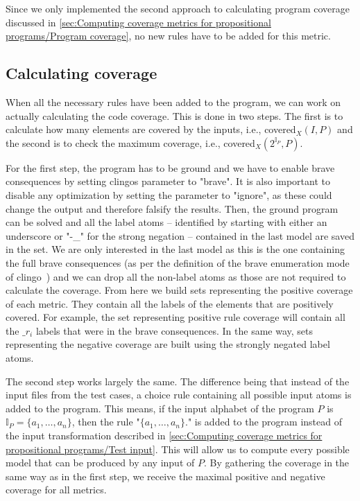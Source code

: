 Since we only implemented the second approach to calculating program coverage discussed in \cref{sec:Computing coverage metrics for propositional programs/Program coverage}, no new rules have to be added for this metric.

\subsection{Calculating coverage}
\label{subsec:Computing coverage metrics for propositional programs/Implementation details/Calculating coverage}
When all the necessary rules have been added to the program, we can work on actually calculating the code coverage. This is done in two steps. The first is to calculate how many elements are covered by the inputs, i.e., covered\(_X(I, P)\) and the second is to check the maximum coverage, i.e., covered\(_X(2^{\mathbb{I}_P}, P)\). 

For the first step, the program has to be ground and we have to enable brave consequences by setting clingos  parameter to "brave". It is also important to disable any optimization by setting the  parameter to "ignore", as these could change the output and therefore falsify the results. Then, the ground program can be solved and all the label atoms -- identified by starting with either an underscore or "-\_" for the strong negation -- contained in the last model are saved in the  set. We are only interested in the last model as this is the one containing the full brave consequences (as per the definition of the brave enumeration mode of clingo~\cite{GKS09}) and we can drop all the non-label atoms as those are not required to calculate the coverage. From here we build sets representing the positive coverage of each metric. They contain all the labels of the elements that are positively covered. For example, the set representing positive rule coverage will contain all the $\_r_i$ labels that were in the brave consequences. In the same way, sets representing the negative coverage are built using the strongly negated label atoms.

The second step works largely the same. The difference being that instead of the input files from the test cases, a choice rule containing all possible input atoms is added to the program. This means, if the input alphabet of the program $P$ is \(\mathbb{I}_P = \{a_1, \ldots, a_n\}\), then the rule "\(\{a_1, \ldots, a_n\}.\)" is added to the program instead of the input transformation described in \cref{sec:Computing coverage metrics for propositional programs/Test input}. This will allow us to compute every possible model that can be produced by any input of $P$. By gathering the coverage in the same way as in the first step, we receive the maximal positive and negative coverage for all metrics.

